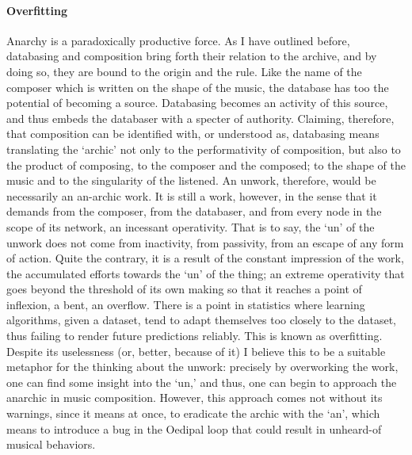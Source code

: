 \paragraph{Overfitting}
Anarchy is a paradoxically productive force. As I have outlined before, databasing and composition bring forth their relation to the archive, and by doing so, they are bound to the origin and the rule. Like the name of the composer which is written on the shape of the music, the database has too the potential of becoming a source. Databasing becomes an activity of this source, and thus embeds the databaser with a specter of authority. Claiming, therefore, that composition can be identified with, or understood as, databasing means translating the `archic' not only to the performativity of composition, but also to the product of composing, to the composer and the composed; to the shape of the music and to the singularity of the listened. An unwork, therefore, would be necessarily an an-archic work. It is still a work, however, in the sense that it demands from the composer, from the databaser, and from every node in the scope of its network, an incessant operativity. That is to say, the `un' of the unwork does not come from inactivity, from passivity, from an escape of any form of action. Quite the contrary, it is a result of the constant impression of the work, the accumulated efforts towards the `un' of the thing; an extreme operativity that goes beyond the threshold of its own making so that it reaches a point of inflexion, a bent, an overflow. There is a point in statistics where learning algorithms, given a dataset, tend to adapt themselves too closely to the dataset, thus failing to render future predictions reliably. This is known as overfitting. Despite its uselessness (or, better, because of it) I believe this to be a suitable metaphor for the thinking about the unwork: precisely by overworking the work, one can find some insight into the `un,' and thus, one can begin to approach the anarchic in music composition. However, this approach comes not without its warnings, since it means at once, to eradicate the archic with the `an', which means to introduce a bug in the Oedipal loop that could result in unheard-of musical behaviors.
